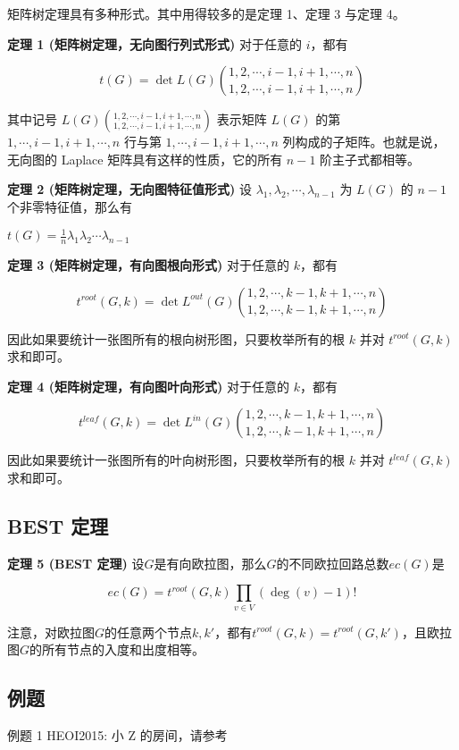 矩阵树定理具有多种形式。其中用得较多的是定理 1、定理 3 与定理 4。

\textbf{定理 1 (矩阵树定理，无向图行列式形式)} 对于任意的 $i$，都有

$$
t(G) = \det L(G)\binom{1,2,\cdots,i-1,i+1,\cdots,n}{1,2,\cdots,i-1,i+1,\cdots,n}
$$

其中记号 $L(G)\binom{1,2,\cdots,i-1,i+1,\cdots,n}{1,2,\cdots,i-1,i+1,\cdots,n}$ 表示矩阵 $L(G)$ 的第 $1,\cdots,i-1,i+1,\cdots,n$ 行与第 $1,\cdots,i-1,i+1,\cdots,n$ 列构成的子矩阵。也就是说，无向图的 Laplace 矩阵具有这样的性质，它的所有 $n-1$ 阶主子式都相等。

\textbf{定理 2 (矩阵树定理，无向图特征值形式)} 设 $\lambda_1, \lambda_2, \cdots, \lambda_{n-1}$ 为 $L(G)$ 的 $n - 1$ 个非零特征值，那么有

$t(G) = \frac{1}{n}\lambda_1\lambda_2\cdots\lambda_{n-1}$

\textbf{定理 3 (矩阵树定理，有向图根向形式)} 对于任意的 $k$，都有

$$
t^{root}(G,k) = \det L^{out}(G)\binom{1,2,\cdots,k-1,k+1,\cdots,n}{1,2,\cdots,k-1,k+1,\cdots,n}
$$

因此如果要统计一张图所有的根向树形图，只要枚举所有的根 $k$ 并对 $t^{root}(G,k)$ 求和即可。

\textbf{定理 4 (矩阵树定理，有向图叶向形式)} 对于任意的 $k$，都有

$$
t^{leaf}(G,k) = \det L^{in}(G)\binom{1,2,\cdots,k-1,k+1,\cdots,n}{1,2,\cdots,k-1,k+1,\cdots,n}
$$

因此如果要统计一张图所有的叶向树形图，只要枚举所有的根 $k$ 并对 $t^{leaf}(G,k)$ 求和即可。

\subsection{BEST 定理}

\textbf{定理 5 (BEST 定理)} 设$G$是有向欧拉图，那么$G$的不同欧拉回路总数$ec(G)$是

$$
ec(G) = t^{root}(G,k)\prod_{v\in V}(\deg (v) - 1)!
$$

注意，对欧拉图$G$的任意两个节点$k, k'$，都有$t^{root}(G,k)=t^{root}(G,k')$，且欧拉图$G$的所有节点的入度和出度相等。

\subsection{例题}

\begin{NOTE}{例题 1}{}
HEOI2015: 小 Z 的房间，请参考\href{https://www.lydsy.com/JudgeOnline/problem.php?id=4031}{}
\end{NOTE}


